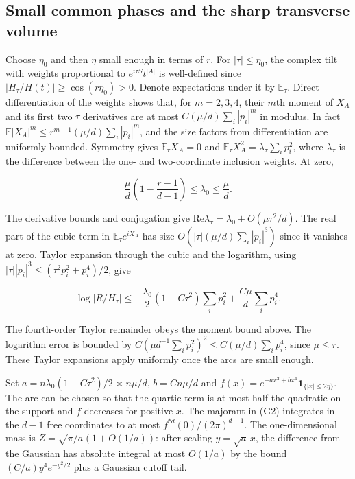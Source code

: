 \subsection{Small common phases and the sharp transverse volume}

Choose $\eta_0$ and then $\eta$ small enough in terms of $r$. For $|\tau|\le\eta_0$, the complex tilt with weights proportional to $e^{i\tau S}t^{|A|}$ is well-defined since $|H_\tau/H(t)|\ge\cos(r\eta_0)>0$. Denote expectations under it by $\mathbb E_\tau$. Direct differentiation of the weights shows that, for $m=2,3,4$, their $m$th moment of $X_A$ and its first two $\tau$ derivatives are at most $C(\mu/d)\sum_i|p_i|^m$ in modulus. In fact $\mathbb E|X_A|^m\le r^{m-1}(\mu/d)\sum_i|p_i|^m$, and the size factors from differentiation are uniformly bounded. Symmetry gives $\mathbb E_\tau X_A=0$ and $\mathbb E_\tau X_A^2=\lambda_\tau\sum_i p_i^2$, where $\lambda_\tau$ is the difference between the one- and two-coordinate inclusion weights. At zero,

\begin{equation*}
\frac{\mu}{d}\left(1-\frac{r-1}{d-1}\right)\le\lambda_0\le\frac{\mu}{d}.
\end{equation*}

The derivative bounds and conjugation give $\mathrm{Re}\lambda_\tau=\lambda_0+O(\mu\tau^2/d)$. The real part of the cubic term in $\mathbb E_\tau e^{iX_A}$ has size $O(|\tau|(\mu/d)\sum_i|p_i|^3)$ since it vanishes at zero. Taylor expansion through the cubic and the logarithm, using $|\tau||p_i|^3\le(\tau^2p_i^2+p_i^4)/2$, give

\begin{equation}
\log|R/H_\tau|
\le-\frac{\lambda_0}{2}(1-C\tau^2)\sum_i p_i^2
 +\frac{C\mu}{d}\sum_i p_i^4.
\tag{G2}
\end{equation}

The fourth-order Taylor remainder obeys the moment bound above. The logarithm error is bounded by $C(\mu d^{-1}\sum_i p_i^2)^2\le C(\mu/d)\sum_i p_i^4$, since $\mu\le r$. These Taylor expansions apply uniformly once the arcs are small enough.

Set $a=n\lambda_0(1-C\tau^2)/2\asymp n\mu/d$, $b=Cn\mu/d$ and $f(x)=e^{-ax^2+bx^4}\mathbf1_{\{|x|\le2\eta\}}$. The arc can be chosen so that the quartic term is at most half the quadratic on the support and $f$ decreases for positive $x$. The majorant in (G2) integrates in the $d-1$ free coordinates to at most $f^{*d}(0)/(2\pi)^{d-1}$. The one-dimensional mass is $Z=\sqrt{\pi/a}(1+O(1/a))$: after scaling $y=\sqrt a\,x$, the difference from the Gaussian has absolute integral at most $O(1/a)$ by the bound $(C/a)y^4e^{-y^2/2}$ plus a Gaussian cutoff tail.

